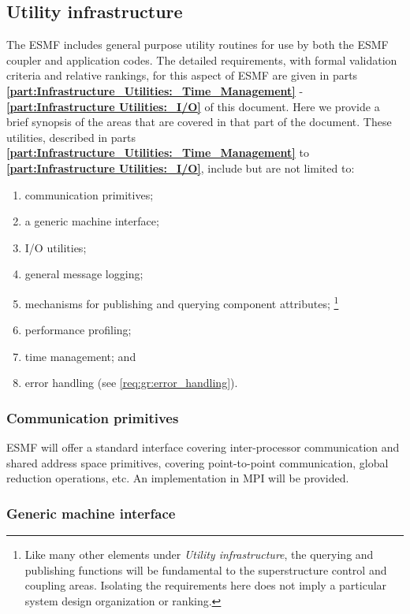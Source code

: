 \subsection{Utility infrastructure}
The ESMF includes general purpose utility routines for use by both 
the ESMF coupler and application codes.
The detailed requirements, with formal validation criteria
and relative rankings, for this aspect of ESMF are given
in parts {\bf \ref{part:Infrastructure_Utilities:_Time_Management}} -
 {\bf \ref{part:Infrastructure Utilities:_I/O}} of this document.
Here we provide a brief synopsis of the areas that are covered
in that part of the document.
These utilities, described in parts {\bf \ref{part:Infrastructure_Utilities:_Time_Management}} to 
{\bf \ref{part:Infrastructure Utilities:_I/O}},
include but are not limited to:
\begin{enumerate}
\item communication primitives;
\item a generic machine interface;
\item I/O utilities;
\item general message logging;
\item mechanisms for publishing and querying component attributes;
\footnote{Like many other elements under
{\it Utility infrastructure}, the querying and publishing functions will be 
fundamental to the superstructure control and coupling areas. Isolating the
requirements here does not imply a particular system design organization
or ranking.
}
\item performance profiling;
\item time management; and
\item error handling (see \ref{req:gr:error_handling}).
\end{enumerate}

\subsubsection{Communication primitives}

ESMF will offer a standard interface covering inter-processor
communication and shared address space primitives, covering
point-to-point communication, global reduction operations, etc. An
implementation in MPI will be provided.

\subsubsection{Generic machine interface}

